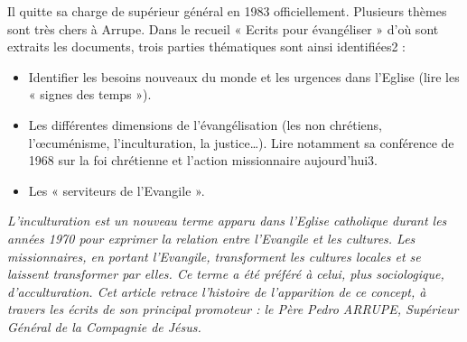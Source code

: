 Il quitte sa charge de supérieur général en 1983 officiellement.
Plusieurs thèmes sont très chers à Arrupe. Dans le recueil « Ecrits pour évangéliser » d’où sont extraits les documents, trois parties thématiques sont ainsi identifiées2 :
\begin{itemize}
    \item  	Identifier les besoins nouveaux du monde et les urgences dans l’Eglise (lire les
« signes des temps »).
    \item 	Les différentes dimensions de l’évangélisation (les non chrétiens, l’œcuménisme, l’inculturation, la justice…). Lire notamment sa conférence de 1968 sur la foi chrétienne et l’action missionnaire aujourd’hui3.
    \item Les « serviteurs de l’Evangile ».
\end{itemize}


\textit{L'inculturation est un nouveau terme apparu dans l'Eglise catholique durant les années 1970 pour exprimer la relation entre
l'Evangile et les cultures. Les missionnaires, en portant l'Evangile, transforment les cultures locales et se laissent transformer
par elles. Ce terme a été préféré à celui, plus sociologique, d'acculturation. Cet article retrace l'histoire de l'apparition de ce
concept, à travers les écrits de son principal promoteur : le Père Pedro ARRUPE, Supérieur Général de la Compagnie de
Jésus.}

